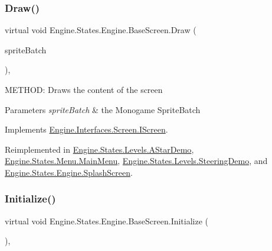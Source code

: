 \subsubsection{\texorpdfstring{Draw()}{Draw()}}
{\footnotesize\ttfamily virtual void Engine.\+States.\+Engine.\+Base\+Screen.\+Draw (\begin{DoxyParamCaption}\item[{Sprite\+Batch}]{sprite\+Batch }\end{DoxyParamCaption})\hspace{0.3cm}{\ttfamily [inline]}, {\ttfamily [virtual]}}



M\+E\+T\+H\+OD\+: Draws the content of the screen 


\begin{DoxyParams}{Parameters}
{\em sprite\+Batch} & the Monogame Sprite\+Batch\\
\hline
\end{DoxyParams}


Implements \hyperlink{a00466_a0c61f739fb252fcc90b91b1358511d05}{Engine.\+Interfaces.\+Screen.\+I\+Screen}.



Reimplemented in \hyperlink{a00562_ad5b2061652982cb94e7c01c39f59a984}{Engine.\+States.\+Levels.\+A\+Star\+Demo}, \hyperlink{a00574_a193970cc59914f538ae0bcd39fe1ef48}{Engine.\+States.\+Menu.\+Main\+Menu}, \hyperlink{a00570_a32c772a646fe78f26a4e9f83ae327156}{Engine.\+States.\+Levels.\+Steering\+Demo}, and \hyperlink{a00554_ae50fb213e5c1efc8d3908340b236e927}{Engine.\+States.\+Engine.\+Splash\+Screen}.

\mbox{\label{a00550_af8fd6890abf865641e190578ef2e054c}} 
\subsubsection{\texorpdfstring{Initialize()}{Initialize()}}
{\footnotesize\ttfamily virtual void Engine.\+States.\+Engine.\+Base\+Screen.\+Initialize (\begin{DoxyParamCaption}{ }\end{DoxyParamCaption})\hspace{0.3cm}{\ttfamily [inline]}, {\ttfamily [virtual]}}



